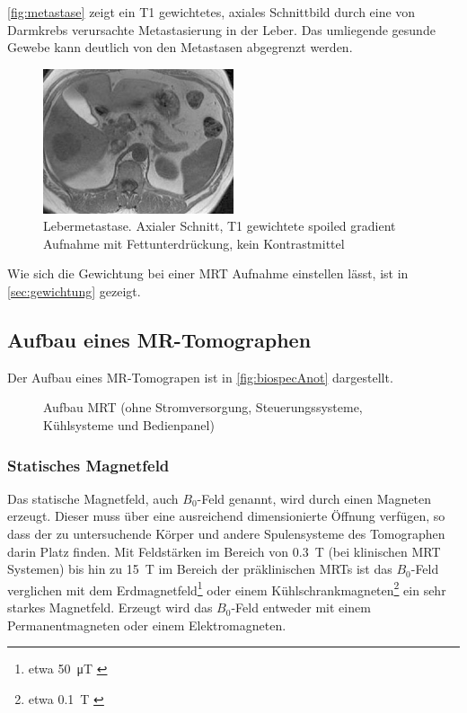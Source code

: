 \autoref{fig:metastase} zeigt ein T1 gewichtetes, axiales Schnittbild durch eine von Darmkrebs verursachte Metastasierung in der Leber. Das umliegende gesunde Gewebe kann deutlich von den Metastasen abgegrenzt werden.

\begin{figure}[H]
	\centering
	\includegraphics[width=0.5\textwidth]{img/metastase.png}
	\caption[Lebermetastase]{Lebermetastase. Axialer Schnitt, T1 gewichtete spoiled gradient Aufnahme mit Fettunterdrückung, kein Kontrastmittel \cite[S.~872]{Reiser2008}}
	\label{fig:metastase}
\end{figure}

Wie sich die Gewichtung bei einer MRT Aufnahme einstellen lässt, ist in \autoref{sec:gewichtung} gezeigt.

\subsection{Aufbau eines MR-Tomographen}
Der Aufbau eines MR-Tomograpen ist in \autoref{fig:biospecAnot} dargestellt.

\begin{figure}[H]
	\centering
	\caption[Aufbau MR-Tomographen]{Aufbau MRT (ohne Stromversorgung, Steuerungssysteme, Kühlsysteme und Bedienpanel)}
	\label{fig:biospecAnot}
\end{figure}

\subsubsection{Statisches Magnetfeld}
Das statische Magnetfeld, auch $B_0$-Feld genannt, wird durch einen Magneten erzeugt. Dieser muss über eine ausreichend dimensionierte Öffnung verfügen, so dass der zu untersuchende Körper und andere Spulensysteme des Tomographen darin Platz finden. Mit Feldstärken im Bereich von \SI{0.3}{\tesla} (bei klinischen MRT Systemen) bis hin zu \SI{15}{\tesla} im Bereich der präklinischen MRTs ist das $B_0$-Feld verglichen mit dem Erdmagnetfeld\footnote{etwa \SI{50}{\micro\tesla} \cite{Enc1994}} oder einem Kühlschrankmagneten\footnote{etwa \SI{0.1}{\tesla} \cite{LHC2018}} ein sehr starkes Magnetfeld.
Erzeugt wird das $B_0$-Feld entweder mit einem Permanentmagneten oder einem Elektromagneten. 

